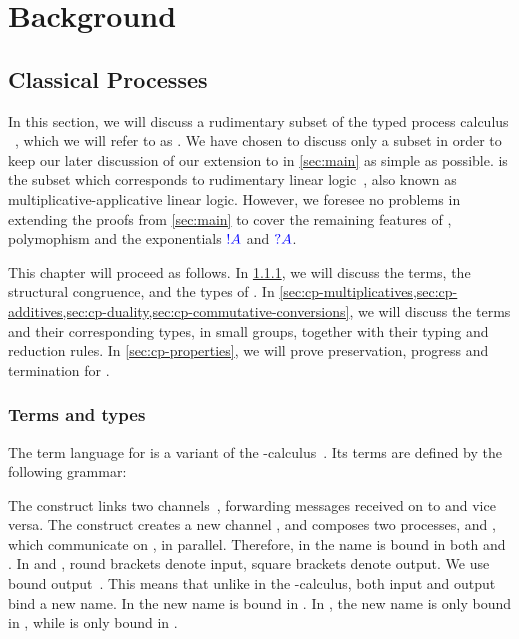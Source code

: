 \chapter{Background}\label{sec:background}
\section{Classical Processes}\label{sec:cp}
In this section, we will discuss a rudimentary subset of the typed process
calculus \cp~\cite{wadler2012,lindley2015semantics}, which we will refer to as
\rcp. 
We have chosen to discuss only a subset in order to keep our later discussion of
our extension to \cp in \cref{sec:main} as simple as possible.
\rcp is the subset which corresponds to rudimentary linear
logic~\cite[RLL]{girard1992}, also known as multiplicative-applicative linear
logic. 
However, we foresee no problems in extending the proofs from \cref{sec:main} to
cover the remaining features of \cp, polymophism and the exponentials $\textcolor{blue}{!A}$
and $\textcolor{blue}{?A}$. 

This chapter will proceed as follows.
In \cref{sec:cp-terms-and-types}, we will discuss the terms, the structural
congruence, and the types of \rcp. 
In \cref{sec:cp-multiplicatives,sec:cp-additives,sec:cp-duality,sec:cp-commutative-conversions},
we will discuss the terms and their corresponding types, in small groups,
together with their typing and reduction rules.
In \cref{sec:cp-properties}, we will prove preservation, progress and
termination for \rcp.

\subsection{Terms and types}\label{sec:cp-terms-and-types}
The term language for \rcp is a variant of the
\textpi-calculus~\cite{milner1992b}.
Its terms are defined by the following grammar:

The construct  links two
channels~\cite{sangiorgi1996,boreale1998}, forwarding messages received on
 to  and vice versa.
The construct  creates a new channel , and composes
two processes,  and , which communicate on , in parallel.
Therefore, in  the name  is bound in both  and
.
In  and , round brackets denote
input, square brackets denote output. 
We use bound output~\cite{sangiorgi1996}.
This means that unlike in the \textpi-calculus, both input and output bind a new
name.
In  the new name  is bound in .
In , the new name  is only bound in , while
 is only bound in .

